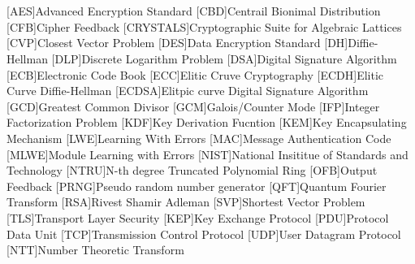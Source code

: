 \cleardoublepage
\chapter*{\listofabbrevname}
{}

\begin{acronym}[mmmmmmm]
	[AES]{Advanced Encryption Standard}
	[CBD]{Centrail Bionimal Distribution}
	[CFB]{Cipher Feedback}
	[CRYSTALS]{Cryptographic Suite for Algebraic Lattices}
	[CVP]{Closest Vector Problem}
	[DES]{Data Encryption Standard}
	[DH]{Diffie-Hellman}
	[DLP]{Discrete Logarithm Problem}
	[DSA]{Digital Signature Algorithm}
	[ECB]{Electronic Code Book}
	[ECC]{Elitic Cruve Cryptography}
	[ECDH]{Elitic Curve Diffie-Hellman}
	[ECDSA]{Elitpic curve Digital Signature Algorithm}
	[GCD]{Greatest Common Divisor}
	[GCM]{Galois/Counter Mode}
	[IFP]{Integer Factorization Problem}
	[KDF]{Key Derivation Fucntion}
	[KEM]{Key Encapsulating Mechanism}
	[LWE]{Learning With Errors}
	[MAC]{Message Authentication Code}
	[MLWE]{Module Learning with Errors}
	[NIST]{National Insititue of Standards and Technology}
	[NTRU]{N-th degree Truncated Polynomial Ring}
	[OFB]{Output Feedback}
	[PRNG]{Pseudo random number generator}
	[QFT]{Quantum Fourier Transform}
	[RSA]{Rivest Shamir Adleman}
	[SVP]{Shortest Vector Problem}
	[TLS]{Transport Layer Security}
  [KEP]{Key Exchange Protocol}
  [PDU]{Protocol Data Unit}
  [TCP]{Transmission Control Protocol}
  [UDP]{User Datagram Protocol}
	[NTT]{Number Theoretic Transform}
\end{acronym}
